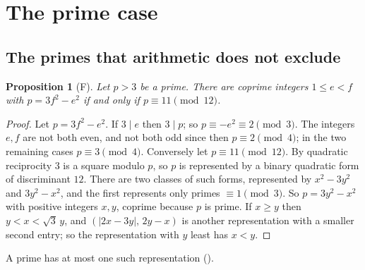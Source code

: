 \documentclass[11pt,reqno]{amsart}
\theoremstyle{plain}
\newtheorem{proposition}[theorem]{Proposition}
\theoremstyle{definition}
\newcommand{\sF}{\textup{\textsf{F}}}
\begin{document}
\section{The prime case}\label{sec:prime}

\subsection{The primes that arithmetic does not exclude}

\begin{proposition}[\sF]\label{prop:mod12}
Let $p>3$ be a prime. There are coprime integers $1\le e<f$ with $p=3f^2-e^2$ if and only if
$p\equiv11\pmod{12}$.
\end{proposition}

\begin{proof}
Let $p=3f^2-e^2$. If $3\mid e$ then $3\mid p$; so $p\equiv-e^2\equiv2\pmod3$. The integers $e,f$ are not both
even, and not both odd since then $p\equiv2\pmod4$; in the two remaining cases $p\equiv3\pmod4$. Conversely
let $p\equiv11\pmod{12}$. By quadratic reciprocity $3$ is a square modulo $p$, so $p$ is represented by a
binary quadratic form of discriminant $12$. There are two classes of such forms, represented by $x^2-3y^2$
and $3y^2-x^2$, and the first represents only primes $\equiv1\pmod3$. So $p=3y^2-x^2$ with positive integers
$x,y$, coprime because $p$ is prime. If $x\ge y$ then $y<x<\sqrt3\,y$, and $(|2x-3y|,\,2y-x)$ is another
representation with a smaller second entry; so the representation with $y$ least has $x<y$.
\end{proof}

A prime has at most one such representation ().
\end{document}
